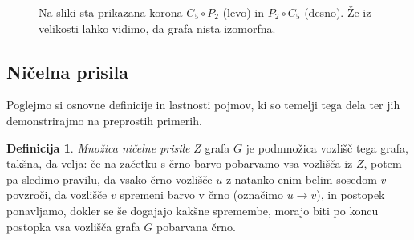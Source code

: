 \documentclass[12pt,a4paper,twoside]{article}
\theoremstyle{definition} %
\newtheorem{definicija}{Definicija}[section]
\theoremstyle{plain} %
\numberwithin{equation}{section}  %
\begin{document}
\begin{figure}[!h]
\begin{subfigure}{0.66\textwidth}
    \end{subfigure}
    \caption{Na sliki sta prikazana korona $C_5 \circ P_2$ (levo) in $P_2 \circ C_5$ (desno). Že iz velikosti lahko vidimo, da grafa nista izomorfna.}
    \label{fig:korona-poti-cikla}
\end{figure}

\subsection{Ničelna prisila}

Poglejmo si osnovne definicije in lastnosti pojmov, ki so temelji tega dela ter jih demonstrirajmo na preprostih primerih.

\begin{definicija}
    \emph{Množica ničelne prisile} $Z$ grafa $G$ je podmnožica vozlišč tega grafa, takšna, da velja: če na začetku s črno barvo pobarvamo vsa vozlišča iz $Z$, potem pa sledimo pravilu, da vsako črno vozlišče $u$ z natanko enim belim sosedom $v$ povzroči, da vozlišče $v$ spremeni barvo v črno (označimo $u \rightarrow v$), in postopek ponavljamo, dokler se še dogajajo kakšne spremembe, morajo biti po koncu postopka vsa vozlišča grafa $G$ pobarvana črno.
\end{definicija}
\end{document}
